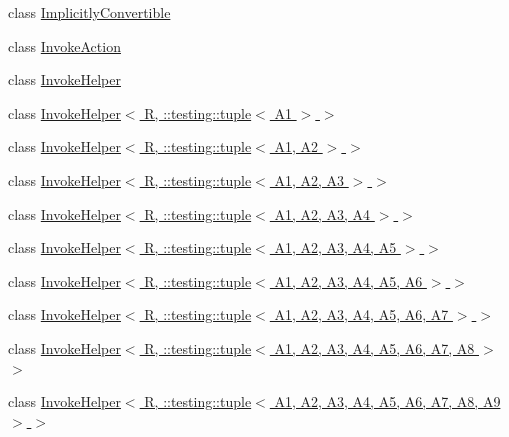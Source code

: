 \begin{DoxyCompactItemize}
\item 
class \hyperlink{classtesting_1_1internal_1_1ImplicitlyConvertible}{Implicitly\+Convertible}
\item 
class \hyperlink{classtesting_1_1internal_1_1InvokeAction}{Invoke\+Action}
\item 
class \hyperlink{classtesting_1_1internal_1_1InvokeHelper}{Invoke\+Helper}
\item 
class \hyperlink{classtesting_1_1internal_1_1InvokeHelper_3_01R_00_01_1_1testing_1_1tuple_3_01A1_01_4_01_4}{Invoke\+Helper$<$ R, \+::testing\+::tuple$<$ A1 $>$ $>$}
\item 
class \hyperlink{classtesting_1_1internal_1_1InvokeHelper_3_01R_00_01_1_1testing_1_1tuple_3_01A1_00_01A2_01_4_01_4}{Invoke\+Helper$<$ R, \+::testing\+::tuple$<$ A1, A2 $>$ $>$}
\item 
class \hyperlink{classtesting_1_1internal_1_1InvokeHelper_3_01R_00_01_1_1testing_1_1tuple_3_01A1_00_01A2_00_01A3_01_4_01_4}{Invoke\+Helper$<$ R, \+::testing\+::tuple$<$ A1, A2, A3 $>$ $>$}
\item 
class \hyperlink{classtesting_1_1internal_1_1InvokeHelper_3_01R_00_01_1_1testing_1_1tuple_3_01A1_00_01A2_00_01A3_00_01A4_01_4_01_4}{Invoke\+Helper$<$ R, \+::testing\+::tuple$<$ A1, A2, A3, A4 $>$ $>$}
\item 
class \hyperlink{classtesting_1_1internal_1_1InvokeHelper_3_01R_00_01_1_1testing_1_1tuple_3_01A1_00_01A2_00_01A3_00_01A4_00_01A5_01_4_01_4}{Invoke\+Helper$<$ R, \+::testing\+::tuple$<$ A1, A2, A3, A4, A5 $>$ $>$}
\item 
class \hyperlink{classtesting_1_1internal_1_1InvokeHelper_3_01R_00_01_1_1testing_1_1tuple_3_01A1_00_01A2_00_01A3_129338555c00c55487bfe9fa59e479ab}{Invoke\+Helper$<$ R, \+::testing\+::tuple$<$ A1, A2, A3, A4, A5, A6 $>$ $>$}
\item 
class \hyperlink{classtesting_1_1internal_1_1InvokeHelper_3_01R_00_01_1_1testing_1_1tuple_3_01A1_00_01A2_00_01A3_39d55f6ea73f4d04a19cf9b6bab3a605}{Invoke\+Helper$<$ R, \+::testing\+::tuple$<$ A1, A2, A3, A4, A5, A6, A7 $>$ $>$}
\item 
class \hyperlink{classtesting_1_1internal_1_1InvokeHelper_3_01R_00_01_1_1testing_1_1tuple_3_01A1_00_01A2_00_01A3_3417e5c524ad74e18b0b4b31a005e438}{Invoke\+Helper$<$ R, \+::testing\+::tuple$<$ A1, A2, A3, A4, A5, A6, A7, A8 $>$ $>$}
\item 
class \hyperlink{classtesting_1_1internal_1_1InvokeHelper_3_01R_00_01_1_1testing_1_1tuple_3_01A1_00_01A2_00_01A3_1c5f66c8b5e7674a520f1ea38507628c}{Invoke\+Helper$<$ R, \+::testing\+::tuple$<$ A1, A2, A3, A4, A5, A6, A7, A8, A9 $>$ $>$}

\end{DoxyCompactItemize}
